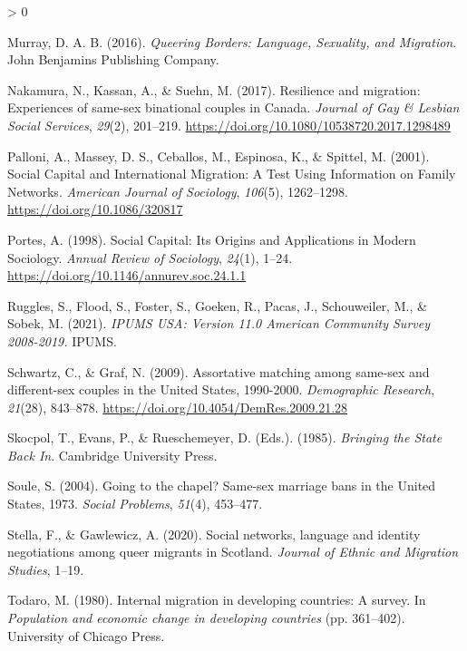 \documentclass[
  11pt,
]{article}
\newlength{\cslhangindent}
\newenvironment{CSLReferences}[2] %
 {%
  \setlength{\parindent}{0pt}
  \ifodd #1 \everypar{\setlength{\hangindent}{\cslhangindent}}\ignorespaces\fi
  \ifnum #2 > 0
  \setlength{\parskip}{#2\baselineskip}
  \fi
 }%
 {}
\begin{document}
\begin{CSLReferences}{1}{0}
\leavevmode\hypertarget{ref-murray_2016}{}%
Murray, D. A. B. (2016). \emph{Queering {Borders}: {Language}, {Sexuality}, and {Migration}}. {John Benjamins Publishing Company}.

\leavevmode\hypertarget{ref-nakamura_2017}{}%
Nakamura, N., Kassan, A., \& Suehn, M. (2017). Resilience and migration: {Experiences} of same-sex binational couples in {Canada}. \emph{Journal of Gay \& Lesbian Social Services}, \emph{29}(2), 201--219. \url{https://doi.org/10.1080/10538720.2017.1298489}

\leavevmode\hypertarget{ref-palloni_2001}{}%
Palloni, A., Massey, D. S., Ceballos, M., Espinosa, K., \& Spittel, M. (2001). Social {Capital} and {International Migration}: {A Test Using Information} on {Family Networks}. \emph{American Journal of Sociology}, \emph{106}(5), 1262--1298. \url{https://doi.org/10.1086/320817}

\leavevmode\hypertarget{ref-portes_1998}{}%
Portes, A. (1998). Social {Capital}: {Its Origins} and {Applications} in {Modern Sociology}. \emph{Annual Review of Sociology}, \emph{24}(1), 1--24. \url{https://doi.org/10.1146/annurev.soc.24.1.1}

\leavevmode\hypertarget{ref-ruggles_2021}{}%
Ruggles, S., Flood, S., Foster, S., Goeken, R., Pacas, J., Schouweiler, M., \& Sobek, M. (2021). \emph{{IPUMS USA}: {Version} 11.0 {American Community Survey} 2008-2019.} {IPUMS}.

\leavevmode\hypertarget{ref-schwartz_2009}{}%
Schwartz, C., \& Graf, N. (2009). Assortative matching among same-sex and different-sex couples in the {United States}, 1990-2000. \emph{Demographic Research}, \emph{21}(28), 843--878. \url{https://doi.org/10.4054/DemRes.2009.21.28}

\leavevmode\hypertarget{ref-skocpol_1985}{}%
Skocpol, T., Evans, P., \& Rueschemeyer, D. (Eds.). (1985). \emph{Bringing the {State Back In}}. {Cambridge University Press}.

\leavevmode\hypertarget{ref-soule_2004}{}%
Soule, S. (2004). Going to the chapel? {Same}-sex marriage bans in the {United States}, 1973{}. \emph{Social Problems}, \emph{51}(4), 453--477.

\leavevmode\hypertarget{ref-stella_2020}{}%
Stella, F., \& Gawlewicz, A. (2020). Social networks, language and identity negotiations among queer migrants in {Scotland}. \emph{Journal of Ethnic and Migration Studies}, 1--19.

\leavevmode\hypertarget{ref-todaro_1980}{}%
Todaro, M. (1980). Internal migration in developing countries: A survey. In \emph{Population and economic change in developing countries} (pp. 361--402). {University of Chicago Press}.


\end{CSLReferences}
\end{document}
